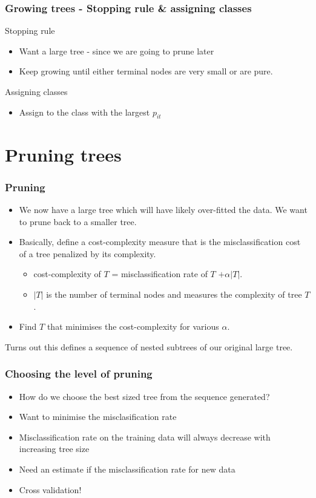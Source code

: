 \documentclass{beamer}
\begin{document}
\begin{frame}
	\frametitle{Growing trees - Stopping rule \& assigning classes}	
	Stopping rule
	\begin{itemize}
		\item Want a large tree - since we are going to prune later
		\item Keep growing until either terminal nodes are very small or are pure.
	\end{itemize}
	Assigning classes
	\begin{itemize}
		\item Assign to the class with the largest $p_{it}$ 
	\end{itemize}
	
\end{frame}

\section{Pruning trees}
\begin{frame}
	\frametitle{Pruning}
\begin{itemize}

	\item 	We now have a large tree which will have likely over-fitted the data.  We want to prune back to a smaller tree.
	\item 	Basically, define a cost-complexity measure that is the misclassification cost of a tree penalized by its complexity.
	\begin{itemize}
	\item 	cost-complexity of $T$ = misclassification rate of $T$ $+ \alpha |T|$.
	\item 	$|T|$ is the number of terminal nodes and measures the complexity of tree $T$.
\end{itemize}
	\item  Find $T$ that minimises the cost-complexity for various $\alpha$.	
\end{itemize}
Turns out this defines a sequence of nested subtrees of our original large tree.

\end{frame}

\begin{frame}
	\frametitle{Choosing the level of pruning}
	\begin{itemize}
		\item How do we choose the best sized tree from the sequence generated?
		\item Want to minimise the misclasification rate
		\item Misclassification rate on the training data will always decrease with increasing tree size
		\item Need an estimate if the misclassification rate for new data
		\item Cross validation!
	\end{itemize}
\end{frame}
\end{document}
